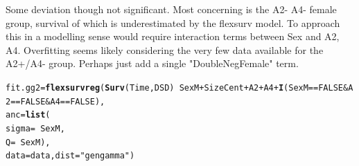 \documentclass{article}\usepackage[]{graphicx}\usepackage[]{color}
\makeatletter
\newcommand{\hlnum}[1]{\textcolor[rgb]{0.686,0.059,0.569}{#1}}%
\newcommand{\hlstr}[1]{\textcolor[rgb]{0.192,0.494,0.8}{#1}}%
\newcommand{\hlopt}[1]{\textcolor[rgb]{0,0,0}{#1}}%
\newcommand{\hlstd}[1]{\textcolor[rgb]{0.345,0.345,0.345}{#1}}%
\newcommand{\hlkwb}[1]{\textcolor[rgb]{0.69,0.353,0.396}{#1}}%
\newcommand{\hlkwc}[1]{\textcolor[rgb]{0.333,0.667,0.333}{#1}}%
\newcommand{\hlkwd}[1]{\textcolor[rgb]{0.737,0.353,0.396}{\textbf{#1}}}%
\newenvironment{kframe}{%
 \def\at@end@of@kframe{}%
 \ifinner\ifhmode%
  \def\at@end@of@kframe{\end{minipage}}%
  \begin{minipage}{\columnwidth}%
 \fi\fi%
 \def\FrameCommand##1{\hskip\@totalleftmargin \hskip-\fboxsep
 \colorbox{shadecolor}{##1}\hskip-\fboxsep
     \hskip-\linewidth \hskip-\@totalleftmargin \hskip\columnwidth}%
 \MakeFramed {\advance\hsize-\width
   \@totalleftmargin\z@ \linewidth\hsize
   \@setminipage}}%
 {\par\unskip\endMakeFramed%
 \at@end@of@kframe}
\newenvironment{knitrout}{}{} %
\makeatother
\begin{document}
Some deviation though not significant.  Most concerning is the A2- A4- female group, survival of which is underestimated by the flexsurv model.  To approach this in a modelling sense would require interaction terms between Sex and A2, A4. Overfitting seems likely considering the very few data available for the A2+/A4- group.  Perhaps just add a single "DoubleNegFemale" term.
\begin{knitrout}
\color{fgcolor}\begin{kframe}
\begin{alltt}
\hlstd{fit.gg2} \hlkwb{=} \hlkwd{flexsurvreg}\hlstd{(}\hlkwd{Surv}\hlstd{(Time, DSD)} \hlopt{~} \hlstd{SexM} \hlopt{+} \hlstd{SizeCent} \hlopt{+} \hlstd{A2} \hlopt{+} \hlstd{A4} \hlopt{+} \hlkwd{I}\hlstd{(SexM} \hlopt{==} \hlnum{FALSE} \hlopt{&} \hlstd{A2} \hlopt{==} \hlnum{FALSE} \hlopt{&} \hlstd{A4} \hlopt{==} \hlnum{FALSE}\hlstd{),}
        \hlkwc{anc} \hlstd{=} \hlkwd{list}\hlstd{(}
                \hlkwc{sigma} \hlstd{=} \hlopt{~} \hlstd{SexM,}
                \hlkwc{Q} \hlstd{=} \hlopt{~} \hlstd{SexM),}
        \hlkwc{data} \hlstd{= data,} \hlkwc{dist} \hlstd{=} \hlstr{"gengamma"}\hlstd{)}


\end{alltt}
\end{kframe}
\end{knitrout}
\end{document}

